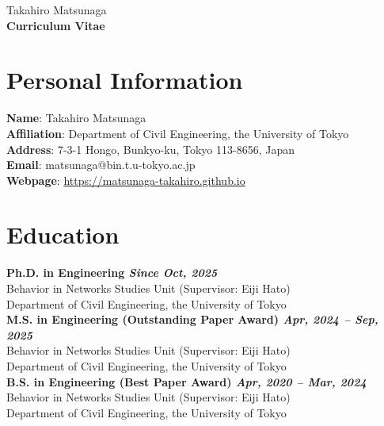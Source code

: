 \documentclass[uplatex,a4paper,10pt,dvipdfmx]{jsarticle}
\begin{document}
\begin{center}
  {\LARGE Takahiro Matsunaga}\\[2mm] 
  \textbf{Curriculum Vitae}\\
\end{center}

\section*{Personal Information}
\textbf{Name}: Takahiro Matsunaga\\
\quad
\textbf{Affiliation}: Department of Civil Engineering, the University of Tokyo \\
\quad
\textbf{Address}: 7-3-1 Hongo, Bunkyo-ku, Tokyo 113-8656, Japan\\
\quad
\textbf{Email}: matsunaga@bin.t.u-tokyo.ac.jp\\
\quad
\textbf{Webpage}: \url{https://matsunaga-takahiro.github.io}

\section*{Education}
\textbf{Ph.D. in Engineering \hfill \textit{Since Oct, 2025}} \\
\quad\quad
Behavior in Networks Studies Unit (Supervisor: Eiji Hato)\\
\quad\quad
Department of Civil Engineering, the University of Tokyo \\

\textbf{M.S. in Engineering (Outstanding Paper Award) \hfill \textit{Apr, 2024 -- Sep, 2025}} \\
\quad\quad
Behavior in Networks Studies Unit (Supervisor: Eiji Hato)\\
\quad\quad
Department of Civil Engineering, the University of Tokyo \\

\textbf{B.S. in Engineering (Best Paper Award) \hfill \textit{Apr, 2020 -- Mar, 2024}} \\
\quad\quad
Behavior in Networks Studies Unit (Supervisor: Eiji Hato)\\
\quad\quad
Department of Civil Engineering, the University of Tokyo 

\vspace{5mm}
\nocite{*}
\end{document}
